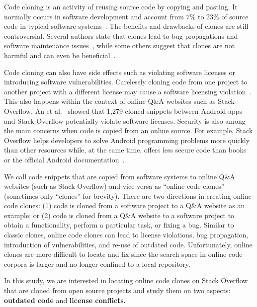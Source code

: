 \documentclass[sigconf,review, anonymous]{acmart}
\newcommand\FIXME[1]{\textbf{FIXME: #1}}
\begin{document}
Code cloning is an activity of reusing source code by copying and
pasting. It normally occurs in software development and account from
7\% to 23\% of source code in typical software
systems~\cite{Bellon2007}. The benefits and drawbacks of clones are
still controversial. Several authors state that clones lead to bug
propagations and software maintenance issues~\cite{Kamiya2002}, while
some others suggest that clones are not harmful and can even be
beneficial~\cite{Saini2016,Kapser2006}.

Code cloning can also have side effects such as violating software
licenses or introducing software vulnerabilities. Carelessly cloning
code from one project to another project with a different license may
cause a software licensing violation~\cite{German2009}. This also
happens within the context of online Q\&A websites such as Stack
Overflow. An et al.~\cite{An2017} showed that 1,279 cloned snippets
between Android apps and Stack Overflow potentially violate software
licenses. Security is also among the main concerns when code is copied
from an online source. For example, Stack Overflow helps developers to solve
Android programming problems more quickly than other resources while,
at the same time, offers less secure code than books or the official
Android documentation~\cite{Acar2016}.


We call code snippets that are copied from software systems to online
Q\&A websites (such as Stack Overflow) and vice versa as ``online
code clones'' (sometimes only ``clones'' for brevity). There are two
directions in creating online code clones: (1) code is cloned from a software
project to a Q\&A website as an example; or (2) code is cloned from a
Q\&A website to a software project to obtain a functionality, perform
a particular task, or fixing a bug.
Similar to classic clones, online code clones can lead to license
violations, bug propagation, introduction of vulnerabilities, and
re-use of outdated code. Unfortunately, online clones are more
difficult to locate and fix since the search space in online code
corpora is larger and no longer confined to a local repository.

In this study, we are interested in locating online code clones on
Stack Overflow that are cloned from open source projects and study
them on two aspects: \textbf{outdated code} and \textbf{license conflicts.}
\end{document}
